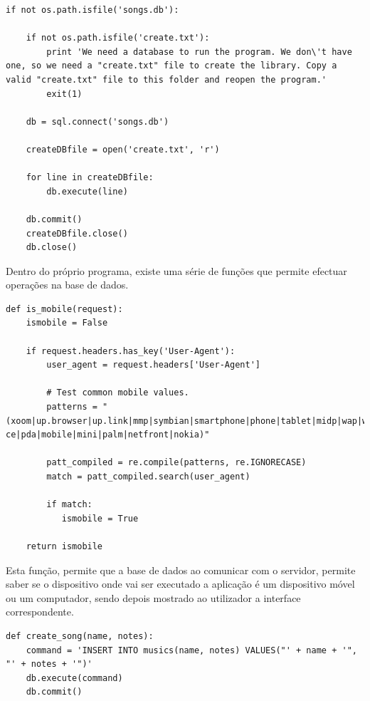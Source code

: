 \vspace{5mm}
\begin{lstlisting}
if not os.path.isfile('songs.db'):
	
	if not os.path.isfile('create.txt'):
		print 'We need a database to run the program. We don\'t have one, so we need a "create.txt" file to create the library. Copy a valid "create.txt" file to this folder and reopen the program.'
		exit(1)
		
	db = sql.connect('songs.db')
	
	createDBfile = open('create.txt', 'r')
	
	for line in createDBfile:
		db.execute(line)	
	
	db.commit()
	createDBfile.close()
	db.close()
\end{lstlisting}
\vspace{5mm}

Dentro do próprio programa, existe uma série de funções que permite efectuar operações na base de dados.

\vspace{5mm}
\begin{lstlisting}
def is_mobile(request):
    ismobile = False

    if request.headers.has_key('User-Agent'):
        user_agent = request.headers['User-Agent']

        # Test common mobile values.
        patterns = "(xoom|up.browser|up.link|mmp|symbian|smartphone|phone|tablet|midp|wap|windows ce|pda|mobile|mini|palm|netfront|nokia)"

        patt_compiled = re.compile(patterns, re.IGNORECASE)
        match = patt_compiled.search(user_agent)

        if match:
           ismobile = True

    return ismobile
\end{lstlisting}
\vspace{5mm}

Esta função, permite que a base de dados ao comunicar com o servidor, permite saber se o dispositivo onde vai ser executado a aplicação é um dispositivo móvel ou um computador, sendo depois mostrado ao utilizador a interface correspondente.  

\vspace{5mm}
\begin{lstlisting}
def create_song(name, notes):
	command = 'INSERT INTO musics(name, notes) VALUES("' + name + '", "' + notes + '")'
	db.execute(command)
	db.commit()
\end{lstlisting}
\vspace{5mm}

